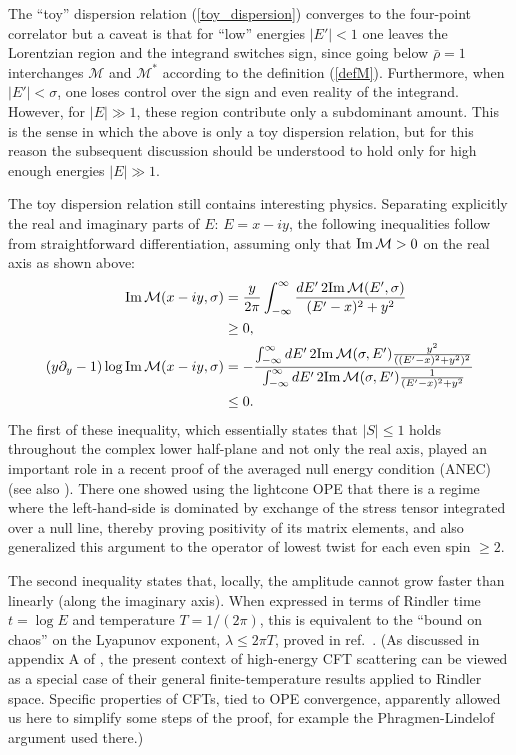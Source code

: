 \documentclass[11pt, reqno,preprint]{article}
\def\be{\begin{equation}}
\def\ee{\end{equation}}
\def\rhobar{\bar{\rho}}
\begin{document}
The ``toy'' dispersion relation (\ref{toy_dispersion}) converges to the four-point correlator but a caveat
is that for ``low'' energies $|E'|< 1$ one leaves the Lorentzian region and the integrand switches sign,
since going below $\rhobar=1$ interchanges $\mathcal{M}$ and $\mathcal{M}^*$
according to the definition (\ref{defM}).
Furthermore, when $|E'|<\sigma$, one loses control over the sign and even reality of the integrand.
However, for $|E|\gg 1$, these region contribute only a subdominant amount.
This is the sense in which the above is only a toy dispersion relation, but for this reason
the subsequent discussion should be understood to hold only for high enough energies $|E| \gg 1$.

The toy dispersion relation still contains interesting physics. Separating explicitly the real and imaginary parts of $E$: $E=x-iy$,
the following inequalities follow from straightforward differentiation, assuming only that ${\rm Im}\,\mathcal{M}>0$ on the real axis as shown above:
\be\begin{aligned}
 {\rm Im}\,\mathcal{M}(x-iy,\sigma) &= \frac{y}{2\pi} \int_{-\infty}^\infty \frac{dE'\,2{\rm Im}\,\mathcal{M}(E',\sigma)}{(E'-x)^2+y^2}
 \\ & \geq0,
\\
(y\partial_y -1) \log
{\rm Im}\,\mathcal{M}(x-iy,\sigma) &=
-\frac
{\int_{-\infty}^\infty dE'\,2{\rm Im}\,\mathcal{M}(\sigma,E')\frac{y^2}{((E'-x)^2+y^2)^2}}
{\int_{-\infty}^\infty dE'\,2{\rm Im}\,\mathcal{M}(\sigma,E')\frac{1}{(E'-x)^2+y^2}}
\\ & \leq0 . \label{inequalities}
\end{aligned}\ee
The first of these inequality, which essentially states that $|S|\leq 1$ holds throughout the complex lower half-plane
and not only the real axis, played an important role in a recent proof of the averaged
null energy condition (ANEC) \cite{Hartman:2016lgu} (see also \cite{Hofman:2016awc}).
There one showed using the lightcone OPE that there is a regime where the left-hand-side is dominated
by exchange of the stress tensor integrated over a null line, thereby proving positivity of its matrix elements,
and also generalized this argument to the operator of lowest twist for each even spin $\geq 2$.

The second inequality states that, locally, the amplitude cannot grow faster than linearly (along the imaginary axis).
When expressed in terms of Rindler time $t=\log E$ and temperature $T=1/(2\pi)$,
this is equivalent to the ``bound on chaos'' on the Lyapunov exponent, $\lambda \leq 2\pi T$, proved in ref.~\cite{Maldacena:2015waa}.
(As discussed in appendix A of \cite{Maldacena:2015waa}, the present context of high-energy CFT scattering can be viewed as a special case of their
general finite-temperature results applied to Rindler space. Specific properties of CFTs, tied to OPE convergence,
apparently allowed us here to simplify some steps of the proof,
for example the Phragmen-Lindelof argument used there.)
\end{document}
